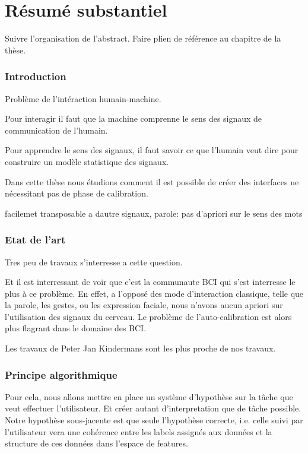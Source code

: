 
\chapter*{Résumé substantiel}
\label{chapter:frecnhresume}
\minitoc

Suivre l'organisation de l'abstract. Faire plien de référence au chapitre de la thèse.

\subsection*{Introduction}

Problème de l'intéraction humain-machine.

Pour interagir il faut que la machine comprenne le sens des signaux de communication de l'humain.

Pour apprendre le sens des signaux,  il faut savoir ce que l'humain veut dire pour construire un modèle statistique des signaux.

Dans cette thèse nous étudions comment il est possible de créer des interfaces ne nécessitant pas de phase de calibration.

facilemet transposable a dautre signaux, parole: pas d'apriori sur le sens des mots

\subsection*{Etat de l'art}

Tres peu de travaux s'interresse a cette question. 

Et il est interressant de voir que c'est la communaute BCI qui s'est interresse le plus à ce problème. En effet, a l'opposé des mode d'interaction classique, telle que la parole, les gestes, ou les expression faciale, nous n'avons aucun apriori sur l'utilisation des signaux du cerveau. Le problème de l'auto-calibration est alors plus flagrant dans le domaine des BCI. 

Les travaux de Peter Jan Kindermans sont les plus proche de nos travaux. 

\subsection*{Principe algorithmique}

Pour cela, nous allons mettre en place un système d'hypothèse sur la tâche que veut effectuer l'utilisateur. Et créer autant d'interpretation que de tâche possible. Notre hypothèse sous-jacente est que seule l'hypothèse correcte, i.e. celle suivi par l'utilisateur vera une cohérence entre les labels assignés aux données et la structure de ces données dans l'espace de features.

